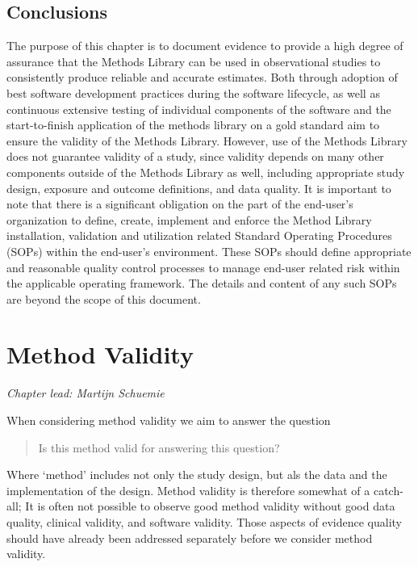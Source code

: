 \documentclass[11pt]{book}
\begin{document}
\section{Conclusions}\label{conclusions}

The purpose of this chapter is to document evidence to provide a high
degree of assurance that the Methods Library can be used in
observational studies to consistently produce reliable and accurate
estimates. Both through adoption of best software development practices
during the software lifecycle, as well as continuous extensive testing
of individual components of the software and the start-to-finish
application of the methods library on a gold standard aim to ensure the
validity of the Methods Library. However, use of the Methods Library
does not guarantee validity of a study, since validity depends on many
other components outside of the Methods Library as well, including
appropriate study design, exposure and outcome definitions, and data
quality. It is important to note that there is a significant obligation
on the part of the end-user's organization to define, create, implement
and enforce the Method Library installation, validation and utilization
related Standard Operating Procedures (SOPs) within the end-user's
environment. These SOPs should define appropriate and reasonable quality
control processes to manage end-user related risk within the applicable
operating framework. The details and content of any such SOPs are beyond
the scope of this document.

\chapter{Method Validity}\label{MethodValidity}

\emph{Chapter lead: Martijn Schuemie}

When considering method validity we aim to answer the question

\begin{quote}
Is this method valid for answering this question?
\end{quote}

Where `method' includes not only the study design, but als the data and
the implementation of the design. Method validity is therefore somewhat
of a catch-all; It is often not possible to observe good method validity
without good data quality, clinical validity, and software validity.
Those aspects of evidence quality should have already been addressed
separately before we consider method validity.
\end{document}
